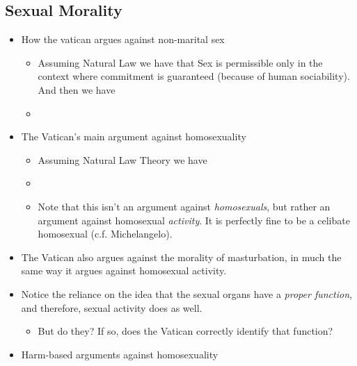\documentclass{article}
\begin{document}
\begin{spacing}{1.2}
    \newpage
    \section{Sexual Morality}
    \begin{itemize}
        \item How the vatican argues against non-marital sex
              \begin{itemize}
                  \item Assuming Natural Law we have that Sex is permissible only in the context where commitment is guaranteed (because of human sociability). And then we have
                  \item {}
              \end{itemize}
        \item The Vatican's main argument against homosexuality
              \begin{itemize}
                  \item Assuming Natural Law Theory we have
                  \item {}
                  \item Note that this isn't an argument against \emph{homosexuals}, but rather an argument against homosexual \emph{activity}. It is perfectly fine to be a celibate homosexual (c.f. Michelangelo).
              \end{itemize}
        \item The Vatican also argues against the morality of masturbation, in much the same way it argues against homosexual activity.
        \item Notice the reliance on the idea that the sexual organs have a \emph{proper function}, and therefore, sexual activity does as well.
              \begin{itemize}
                  \item But do they? If so, does the Vatican correctly identify that function?
              \end{itemize}
        \item Harm-based arguments against homosexuality

\end{itemize}
\end{spacing}
\end{document}
